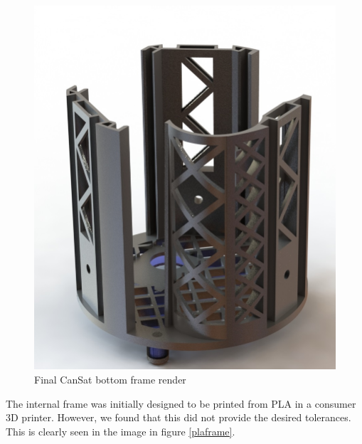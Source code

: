 \documentclass[]{report}
\begin{document}
		
		\begin{figure}[h]
			\hfill\includegraphics[scale=0.4]{Bottom_frame_render.jpg}\hspace*{\fill}
			\caption{Final CanSat bottom frame render}
			\label{bottomframerender}
		\end{figure}
		
		The internal frame was initially designed to be printed from PLA in a consumer 3D printer. However, we found that this did not provide the desired tolerances. This is clearly seen in the image in figure \ref{plaframe}.
		
\end{document}
